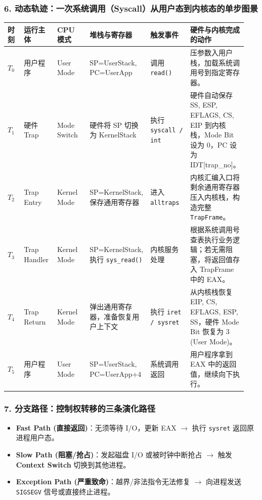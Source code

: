 \documentclass[11pt,a4paper,openany]{ctexbook}
\newcommand{\key}[1]{\textbf{\color{deep}#1}}
\begin{document}
\subsubsection*{6. 动态轨迹：一次系统调用（Syscall）从用户态到内核态的单步图景}
\begingroup
\small
\setlength{\tabcolsep}{2.5pt}
\begin{longtable}{p{0.07\linewidth}p{0.14\linewidth}p{0.14\linewidth}p{0.22\linewidth}p{0.17\linewidth}p{0.20\linewidth}}
\toprule
\textbf{时刻} & \textbf{运行主体} & \textbf{CPU 模式} & \textbf{堆栈与寄存器} & \textbf{触发事件} & \textbf{硬件与内核完成的动作} \\
\midrule
$T_0$ & 用户程序 & User Mode & SP=UserStack, PC=UserApp & 调用 \texttt{read()} & 压参数入用户栈，加载系统调用号到指定寄存器。 \\
\midrule
$T_1$ & 硬件 Trap & Mode Switch & 硬件将 SP 切换为 KernelStack & 执行 \texttt{syscall / int} & 硬件自动保存 SS, ESP, EFLAGS, CS, EIP 到内核栈，Mode Bit 设为 0，PC 设为 IDT[trap\_no]。 \\
\midrule
$T_2$ & Trap Entry & Kernel Mode & SP=KernelStack, 保存通用寄存器 & 进入 \texttt{alltraps} & 内核汇编入口将剩余通用寄存器压入内核栈，构造完整 \texttt{TrapFrame}。 \\
\midrule
$T_3$ & Trap Handler & Kernel Mode & SP=KernelStack, 执行 \texttt{sys\_read()} & 内核服务处理 & 根据系统调用号查表执行业务逻辑；若无需阻塞，将返回值存入 TrapFrame 中的 EAX。 \\
\midrule
$T_4$ & Trap Return & Kernel Mode & 弹出通用寄存器，准备恢复用户上下文 & 执行 \texttt{iret / sysret} & 从内核栈恢复 EIP, CS, EFLAGS, ESP, SS，硬件 Mode Bit 恢复为 3 (User Mode)。 \\
\midrule
$T_5$ & 用户程序 & User Mode & SP=UserStack, PC=UserApp+4 & 系统调用返回 & 用户程序拿到 EAX 中的返回值，继续向下执行。 \\
\bottomrule
\end{longtable}
\endgroup

\subsubsection*{7. 分支路径：控制权转移的三条演化路径}
\begin{itemize}[leftmargin=1.5em]
  \item \textbf{Fast Path (直接返回)}：无须等待 I/O，更新 EAX $\rightarrow$ 执行 \texttt{sysret} 返回原进程用户态。
  \item \textbf{Slow Path (阻塞/抢占)}：发起磁盘 I/O 或被时钟中断抢占 $\rightarrow$ 触发 \key{Context Switch} 切换到其他进程。
  \item \textbf{Exception Path (严重致命)}：越界/非法指令无法修复 $\rightarrow$ 向进程发送 \texttt{SIGSEGV} 信号或直接终止进程。
\end{itemize}
\end{document}
